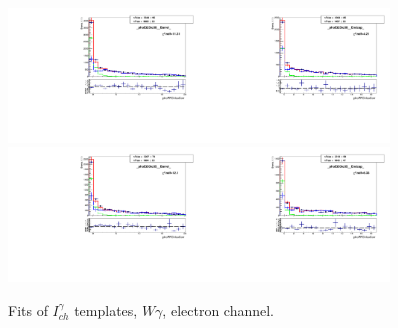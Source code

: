 \begin{figure}[htb]
\begin{center}
   \includegraphics[width=0.45\textwidth]{../figs/figs_v11/ELECTRON_WGamma/TemplateFits/c_TEMPL_CHISO_UNblind__phoEt25to30__Barrel__RooFit.pdf}\includegraphics[width=0.45\textwidth]{../figs/figs_v11/ELECTRON_WGamma/TemplateFits/c_TEMPL_CHISO_UNblind__phoEt25to30__Endcap__RooFit.pdf}\\
   \includegraphics[width=0.45\textwidth]{../figs/figs_v11/ELECTRON_WGamma/TemplateFits/c_TEMPL_CHISO_UNblind__phoEt30to35__Barrel__RooFit.pdf}\includegraphics[width=0.45\textwidth]{../figs/figs_v11/ELECTRON_WGamma/TemplateFits/c_TEMPL_CHISO_UNblind__phoEt30to35__Endcap__RooFit.pdf}\\
  \label{fig:templateFits_CHISO_ELECTRON_1}
  \caption{Fits of $I_{ch}^{\gamma}$ templates, $W\gamma$, electron channel.}
  \end{center}
\end{figure}

